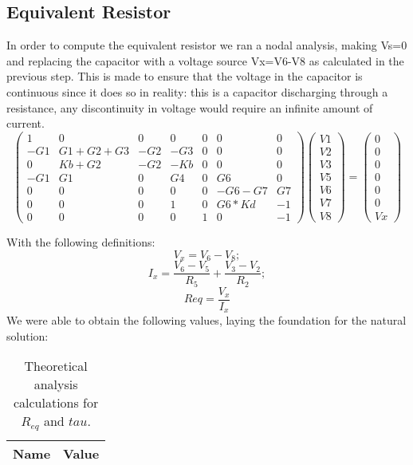 \subsection{Equivalent Resistor}
In order to compute the equivalent resistor we ran a nodal analysis, making Vs=0 and replacing the capacitor with a voltage source Vx=V6-V8 as calculated in the previous step. This is made to ensure that the voltage in the capacitor is continuous since it does so in reality: this is a capacitor discharging through a resistance, any discontinuity in voltage would require an infinite amount of current. 
\begin{equation}
\begin{pmatrix}
1 & 0 & 0 & 0 & 0 & 0 & 0\\
-G1 & G1+G2+G3 & -G2 & -G3 & 0 & 0 & 0\\
0 & Kb+G2 & -G2 & -Kb & 0 & 0 & 0\\
-G1 & G1 & 0 & G4 & 0 & G6 & 0\\
0 & 0 & 0 & 0 & 0 & -G6-G7 & G7\\
0 & 0 & 0 & 1 & 0 & G6*Kd & -1\\
0 & 0 & 0 & 0 & 1 & 0 & -1
\end{pmatrix}
\begin{pmatrix}
V1\\
V2\\
V3\\
V5\\
V6\\
V7\\
V8
\end{pmatrix}
=
\begin{pmatrix}
0\\
0\\
0\\
0\\
0\\
0\\
Vx
\end{pmatrix}
\end{equation}

With the following definitions:
\begin{equation}
V_x=V_6-V_8;
\end{equation}
\begin{equation}
I_x=\frac {V_6-V_5}{R_5}+\frac {V_3-V_2}{R_2};
\end{equation}
\begin{equation}
Req=\frac {V_x}{I_x}
\end{equation}
We were able to obtain the following values, laying the foundation for the natural solution:
\begin{table}[h]
  \centering
  \begin{tabular}{|l|r|}
    \hline    
    {\bf Name} & {\bf Value} \\ \hline
     
  \end{tabular}
  \caption{Theoretical analysis calculations for $R_{eq}$ and $tau$.}
  \label{tab:equivalent}
\end{table}
